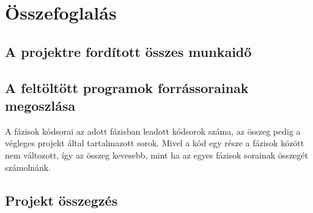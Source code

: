 \chapter{Összefoglalás}
\section{A projektre fordított összes munkaidő}
\begin{ertekelesOra}
\end{ertekelesOra}

\section{A feltöltött programok forrássorainak megoszlása}
\begin{ertekelesKod}
\end{ertekelesKod}

A fázisok kódsorai az adott fázisban leadott kódsorok száma, az összeg pedig a végleges projekt által tartalmazott sorok. Mivel a kód egy része a fázisok között nem változott, így az összeg kevesebb, mint ha az egyes fázisok sorainak összegét számolnánk.

\clearpage

\section{Projekt összegzés}

